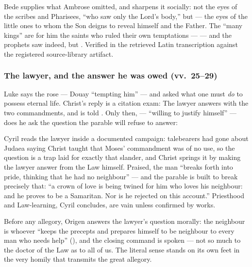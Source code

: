 \begin{witnessnote}
Bede supplies what Ambrose omitted, and sharpens it socially: not the eyes of
the scribes and Pharisees, ``who saw only the Lord's body,'' but  --- the eyes of the little ones to whom the Son deigns to
reveal himself and the Father. The ``many kings'' are for him the saints who
ruled their own temptations ---  --- and the prophets saw indeed, but
. Verified in the retrieved Latin
transcription against the registered source-library artifact.
\end{witnessnote}

\subsubsection*{The lawyer, and the answer he was owed (vv.~25--29)}

Luke says the  rose  --- Douay
``tempting him'' --- and asked what one must \textit{do} to possess eternal
life. Christ's reply is a citation exam:  The lawyer answers with the two commandments, and is told
. Only then,  --- ``willing to justify himself'' --- does he ask the
question the parable will refuse to answer: 

\begin{witnessnote}
Cyril reads the lawyer inside a documented campaign: talebearers had gone
about Judaea saying Christ taught that Moses' commandment was of no use, so
the question is a trap laid for exactly that slander, and Christ springs it by
making the lawyer answer from the Law himself. Praised, the man ``breaks forth
into pride, thinking that he had no neighbour'' --- and the parable is built
to break precisely that: ``a crown of love is being twined for him who loves
his neighbour: and he proves to be a Samaritan. Nor is he rejected on this
account.'' Priesthood and Law-learning, Cyril concludes, are vain unless
confirmed by works.
\end{witnessnote}

\begin{witnessnote}
Before any allegory, Origen answers the lawyer's question morally: the
neighbour is whoever ``keeps the precepts and prepares himself to be neighbour
to every man who needs help'' (), and the closing command is spoken  --- not so much to the doctor of the
Law as to all of us. The literal sense stands on its own feet in the very
homily that transmits the great allegory.
\end{witnessnote}

